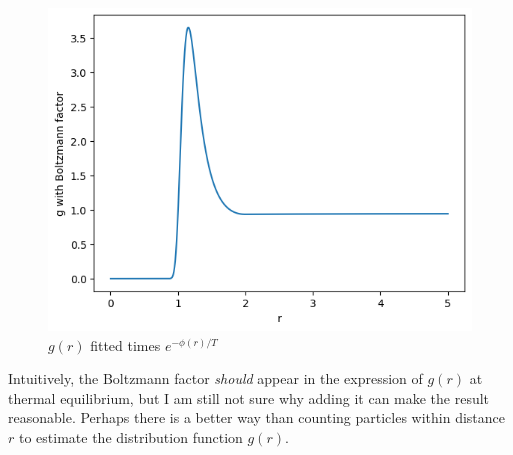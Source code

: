 \documentclass[letterpaper,12pt]{article}
\numberwithin{equation}{section}
\begin{document}
\begin{figure}[H]
    \centering
    \includegraphics{Project/g_with_boltzmann.png}
    \caption{$g(r)$ fitted times $e^{-\phi(r)/T}$} 
    \label{fig:g_with_boltzmann}
\end{figure}
Intuitively, the Boltzmann factor \textit{should} appear in the expression of $g(r)$ at thermal equilibrium, but I am still not sure why adding it can make the result reasonable. Perhaps there is a better way than counting particles within distance $r$ to estimate the distribution function $g(r)$. 
\end{document}
